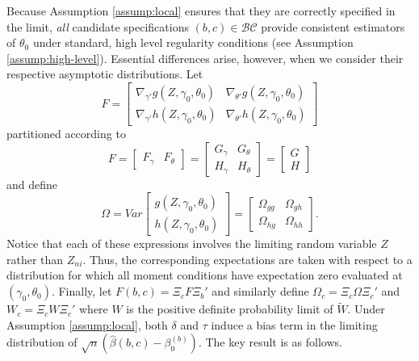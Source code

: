 Because Assumption \ref{assump:local} ensures that they are correctly specified in the limit, \emph{all} candidate specifications $(b,c)\in \mathcal{BC}$ provide consistent estimators of $\theta_0$ under standard, high level regularity conditions (see Assumption \ref{assump:high-level}).
Essential differences arise, however, when we consider their respective asymptotic distributions. 
Let
		\begin{equation}F  =  \left[\begin{array}{cc}  \nabla_{\gamma'}g\left(Z,\gamma_0, \theta_0\right) &   \nabla_{\theta'}g\left(Z,\gamma_0, \theta_0\right) \\
 \nabla_{\gamma'}h\left(Z,\gamma_0, \theta_0\right)  &   \nabla_{\theta'}h\left(Z,\gamma_0, \theta_0\right)  
		 \end{array}\right] 
	\end{equation}
partitioned according to
	\begin{equation}F  = \left[\begin{array}{cc}F_\gamma & F_\theta \end{array}\right] = 
		  \left[\begin{array}{cc} G_\gamma & G_\theta \\
					 H_\gamma& H_\theta
		 \end{array}\right] = \left[\begin{array}{c} G\\ H \end{array}\right]
	\end{equation}
and define
	\begin{equation}
		\Omega = Var\left[ \begin{array}{c} g(Z, \gamma_0, \theta_0) \\ h(Z, \gamma_0, \theta_0) \end{array}\right] =\left[ \begin{array}{cc}\Omega_{gg} & \Omega_{gh}\\ \Omega_{hg}& \Omega_{hh} \end{array} \right].
	\end{equation}
Notice that each of these expressions involves the limiting random variable $Z$ rather than $Z_{ni}$. 
Thus, the corresponding expectations are taken with respect to a distribution for which all moment conditions have expectation zero  evaluated at $(\gamma_0,\theta_0)$.
Finally, let $F(b,c) = \Xi_c F \Xi_b'$ and similarly define $\Omega_c = \Xi_c \Omega \Xi_c'$ and $W_c = \Xi_c W \Xi_c'$ where $W$ is the positive definite probability limit of $\widetilde{W}$. 
Under Assumption \ref{assump:local}, both $\delta$ and $\tau$ induce a bias term in the limiting distribution of $\sqrt{n}\left(\widehat{\beta}(b,c) - \beta_0^{(b)}\right)$. 
The key result is as follows.

